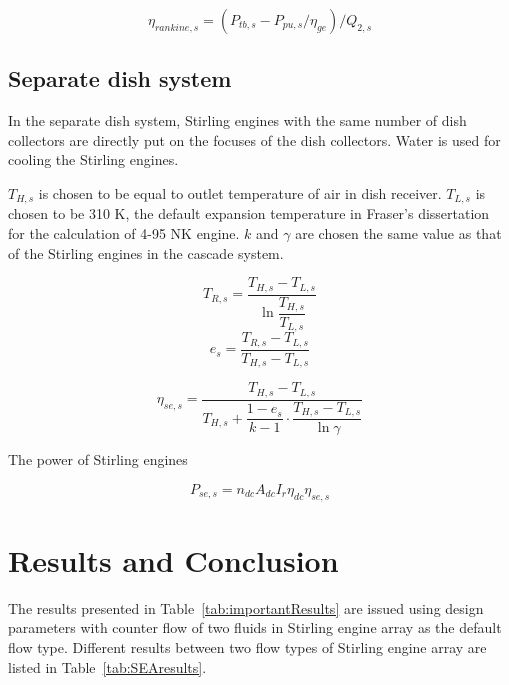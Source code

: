 \documentclass{article}
\begin{document}
\begin{equation*}
	\eta_{rankine,s}=(P_{tb,s}-P_{pu,s}/\eta_{ge})/Q_{2,s}
\end{equation*}

\subsection{Separate dish system}

In the separate dish system, Stirling engines with the same number of dish collectors are directly put on the focuses of the dish collectors. Water is used for cooling the Stirling engines.

$T_{H,s}$ is chosen to be equal to outlet temperature of air in dish receiver. $T_{L,s}$ is chosen to be 310 K, the default expansion temperature in Fraser's dissertation~\cite{Fraser2008} for the calculation of 4-95 NK\uppercase\expandafter{} engine. $k$ and $\gamma$ are chosen the same value as that of the Stirling engines in the cascade system.

\begin{equation*}
	T_{R,s}=\dfrac{T_{H,s}-T_{L,s}}{\ln\dfrac{T_{H,s}}{T_{L,s}}}
\end{equation*}
\begin{equation*}
	e_{s}=\dfrac{T_{R,s}-T_{L,s}}{T_{H,s}-T_{L,s}}
\end{equation*}

\begin{equation*}
	\eta_{se,s}=\dfrac{T_{H,s}-T_{L,s}}{T_{H,s}+\dfrac{1-e_{s}}{k-1}\cdot\dfrac{T_{H,s}-T_{L,s}}{\ln\gamma}}
\end{equation*}

The power of Stirling engines

\begin{equation*}
	P_{se,s}=n_{dc}A_{dc}I_r\eta_{dc}\eta_{se,s}
\end{equation*}

\section{Results and Conclusion}

The results presented in Table~\ref{tab:importantResults} are issued using design parameters with counter flow of two fluids in Stirling engine array as the default flow type. Different results between two flow types of Stirling engine array are listed in Table~\ref{tab:SEAresults}.
\end{document}
